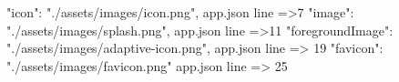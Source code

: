 "icon": "./assets/images/icon.png", app.json line =>7
"image": "./assets/images/splash.png", app.json line =>11
"foregroundImage": "./assets/images/adaptive-icon.png", app.json line => 19
"favicon": "./assets/images/favicon.png" app.json line => 25


